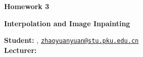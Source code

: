 





\begin{Large}
    \textsf{\textbf{Homework 3}}
    
    \textbf{Interpolation and Image Inpainting}
\end{Large}

\vspace{1ex}

\textsf{\textbf{Student:}} , \href{mailto:your.email@hotmail.com}{\texttt{zhaoyuanyuan@stu.pku.edu.cn}}\\
\textsf{\textbf{Lecturer:}} 


\vspace{2ex}


